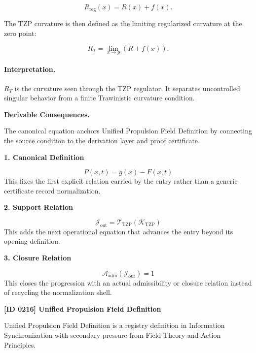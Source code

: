 \begin{equation}
R_{\mathrm{reg}}(x)=R(x)+f(x).
\end{equation}

The TZP curvature is then defined as the limiting regularized curvature at the zero point:

\begin{equation}
\boxed{
R_T
=
\lim_{x\to p}
\left(
R+f(x)
\right).
}
\end{equation}

\paragraph{Interpretation.}
$R_T$ is the curvature seen through the TZP regulator. It separates uncontrolled singular behavior from a finite Trawinistic curvature condition.

\par\vspace{0.35em}
\noindent\textbf{Derivable Consequences.}\quad
\begingroup
\footnotesize
\raggedright
The canonical equation anchors Unified Propulsion Field Definition by connecting the source condition to the derivation layer and proof certificate.
\par\endgroup

\noindent\textbf{1. Canonical Definition}\par
\[
P(x,t)=g(x)-F(x,t)
\]
\noindent This fixes the first explicit relation carried by the entry rather than a generic certificate record normalization.\par
\noindent\textbf{2. Support Relation}\par
\[
\mathcal{J}_{\mathrm{out}} = \mathcal{T}_{\mathrm{TZP}}\!\left(\mathcal{K}_{\mathrm{TZP}}\right)
\]
\noindent This adds the next operational equation that advances the entry beyond its opening definition.\par
\noindent\textbf{3. Closure Relation}\par
\[
\mathcal{A}_{\mathrm{adm}}\!\left(\mathcal{J}_{\mathrm{out}}\right)=1
\]
\noindent This closes the progression with an actual admissibility or closure relation instead of recycling the normalization shell.\par

\clearpage
\noindent\textbf{[ID 0216] Unified Propulsion Field Definition}\par
\vspace{0.35em}
\begingroup\small
{}
Unified Propulsion Field Definition is a registry definition in Information Synchronization with secondary pressure from Field Theory and Action Principles.

